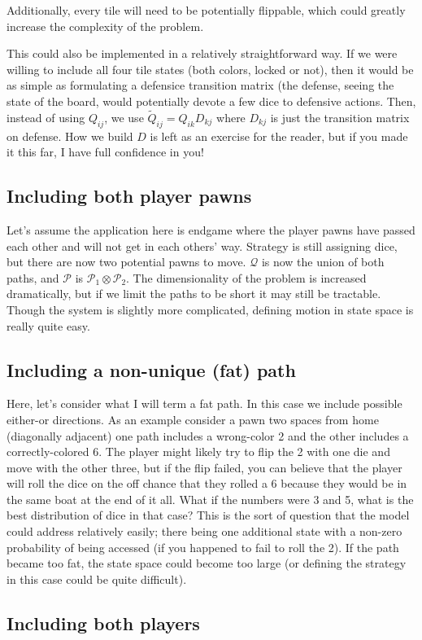 \documentclass[letterpaper,11pt]{article}
\begin{document}
Additionally, every tile will need to be potentially flippable, which could
greatly increase the complexity of the problem.

This could also be implemented in a relatively straightforward way.  If we were
willing to include all four tile states (both colors, locked or not), then it
would be as simple as formulating a defensice transition matrix (the defense,
seeing the state of the board, would potentially devote a few dice to defensive
actions.  Then, instead of using 
$Q_{ij}$, we use $\tilde{Q}_{ij} = Q_{ik}D_{kj}$ where $D_{kj}$ is just the
transition matrix on defense.  How we build $D$ is left as an exercise for the
reader, but if you made it this far, I have full confidence in you!

\subsection{Including both player pawns}
Let's assume the application here is endgame where the player pawns have
passed each other and will not get in each others' way.  Strategy is still
assigning dice, but there are now two potential pawns to move.  $\mathcal{Q}$ 
is now the union of both paths, and $\mathcal{P}$ is $\mathcal{P}_1\otimes
\mathcal{P}_2$.  The dimensionality of the problem is increased dramatically,
but if we limit the paths to be short it may still be tractable.  Though the
system is slightly more complicated, defining motion in state space is really
quite easy.

\subsection{Including a non-unique (fat) path}
Here, let's consider what I will term a fat path.  In this case we include
possible either-or directions.  As an example consider a pawn two spaces from
home (diagonally adjacent) one path includes a wrong-color 2 and the other
includes a correctly-colored 6.  The player might likely try to flip the 2 with
one die and move with the other three, but if the flip failed, you can believe
that the player will roll the dice on the off chance that they rolled a 6
because they would be in the same boat at the end of it all.  What if the
numbers were 3 and 5, what is the best distribution of dice in that case?
This is the sort of question that the model could address relatively easily;
there being one additional state with a non-zero probability of being accessed
(if you happened to fail to roll the 2).  If the path became too fat, the state
space could become too large (or defining the strategy in this case could be
quite difficult).

\subsection{Including both players}
\end{document}

